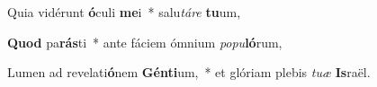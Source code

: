 \item Quia vidérunt \textbf{ó}culi \textbf{me}i~* salu\textit{tá}\textit{re} \textbf{tu}um,
\item \textbf{Quod} pa\textbf{rás}ti~* ante fáciem ómnium \textit{po}\textit{pu}\textbf{ló}rum,
\item Lumen ad revelati\textbf{ó}nem \textbf{Gén}\textbf{ti}um,~* et glóriam plebis \textit{tu}\textit{æ} \textbf{Is}raël.
